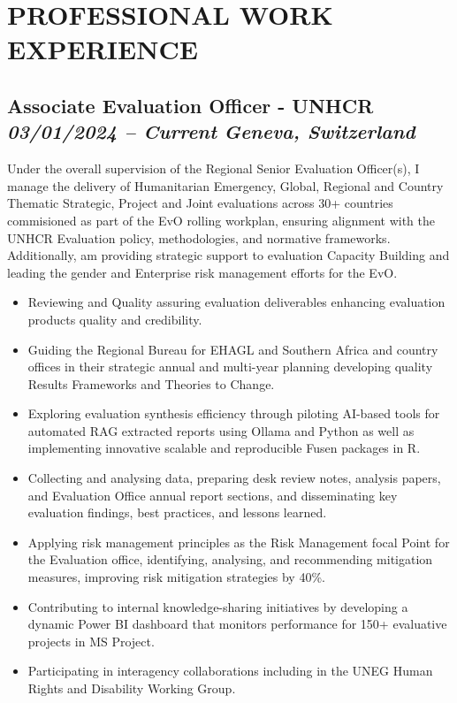 \documentclass[
  10pt,
]{article}
\providecommand{\tightlist}{%
  \setlength{\itemsep}{0pt}\setlength{\parskip}{0pt}}
\begin{document}
\vspace{0.5cm}

\section{PROFESSIONAL WORK EXPERIENCE}\label{work-experience}

\subsection{\texorpdfstring{Associate Evaluation Officer - UNHCR
\emph{03/01/2024 -- Current} \textbar{} \emph{Geneva, Switzerland}}{Associate Evaluation Officer - UNHCR 03/01/2024 -- Current \textbar{} Geneva, Switzerland}}\label{associate-evaluation-officer---unhcr-03012024-current-geneva-switzerland}

Under the overall supervision of the Regional Senior Evaluation Officer(s), I manage the delivery of Humanitarian Emergency, Global, Regional and Country Thematic Strategic, Project and Joint evaluations across 30+ countries commisioned as part of the EvO rolling workplan, ensuring alignment with the UNHCR Evaluation policy, methodologies, and normative frameworks. Additionally, am providing strategic support to evaluation Capacity Building and leading the gender and Enterprise risk management efforts for the EvO.

\begin{itemize}
\tightlist
\item
Reviewing and Quality assuring evaluation deliverables enhancing evaluation products quality and credibility.
\item
Guiding the Regional Bureau for EHAGL and Southern Africa and country offices in their strategic annual and multi-year planning developing quality Results Frameworks and Theories to Change.
\item
Exploring evaluation synthesis efficiency through piloting AI-based tools for automated RAG extracted reports using Ollama and Python as well as implementing innovative scalable and reproducible Fusen packages in R.
\item
Collecting and analysing data, preparing desk review notes, analysis papers, and Evaluation Office annual report sections, and disseminating key evaluation findings, best practices, and lessons learned.
\item
Applying risk management principles as the Risk Management focal Point for the Evaluation office, identifying, analysing, and recommending mitigation measures, improving risk mitigation strategies by 40\%.
\item
Contributing to internal knowledge-sharing initiatives by developing a dynamic Power BI dashboard that monitors performance for 150+ evaluative projects in MS Project.
\item
Participating in interagency collaborations including in the UNEG Human Rights and Disability Working Group.
\end{itemize}
\end{document}
